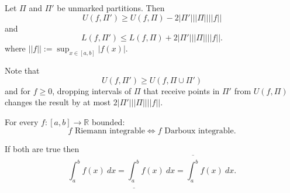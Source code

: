 \documentclass{notes}
\begin{document}
  \begin{lem}
    Let $\Pi$ and $\Pi'$ be unmarked partitions.
    Then 
    \[
      U(f, \Pi') \geq U(f, \Pi) - 2 \left | \Pi' \right | ||\Pi|| ||f||
    \]
    and 
    \[
      L(f, \Pi') \leq L(f, \Pi) + 2 \left | \Pi' \right | ||\Pi|| ||f||.
    \]
    where $||f|| := \sup_{x \in [a, b]} \left | f(x) \right |$.
  \end{lem}
  
  \begin{prf}
    Note that 
    \[
      U(f, \Pi') \geq U(f, \Pi \cup \Pi')
    \]
    and for $f \geq 0$, dropping intervals of $\Pi$ that receive points in $\Pi'$ from $U(f, \Pi)$ changes the result by at most $2 \left | \Pi' \right | ||\Pi|| ||f||$.
  \end{prf}
  
  \newpage
  
  \begin{thm}
    For every $f \colon [a, b] \to \mathbb R$ bounded: 
    \[
      \text{$f$ Riemann integrable} \Leftrightarrow \text{$f$ Darboux integrable}.
    \]
    
    If both are true then 
    \[
      \int_a^b f(x)\ dx = \underline{\int_a^b} f(x)\ dx = \overline{\int_a^b} f(x)\ dx.
    \]
  \end{thm}
  
\end{document}
